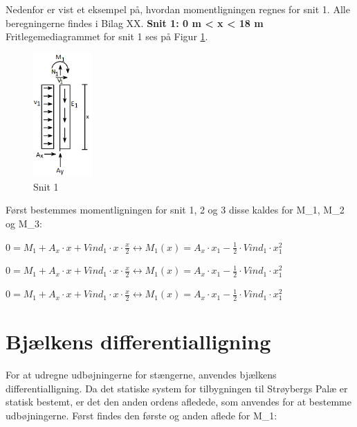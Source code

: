 Nedenfor er vist et eksempel på, hvordan momentligningen regnes for snit 1. Alle beregningerne findes i Bilag XX.
\newline
\newline
\textbf{Snit 1: 0 m < x < 18 m}
\newline
Fritlegemediagrammet for snit 1 ses på Figur \ref{fig:snitetan}.
\begin{figure}[H]
	\centering
	\includegraphics[width=0.2\textwidth]{billeder/asnitet.png}
	\caption{Snit 1}
	\label{fig:snitetan}
\end{figure}


Først bestemmes momentligningen for snit 1, 2 og 3 disse kaldes for M_1, M_2 og M_3:
\begin{center}
	$0 = M_1 + A_x \cdot x + Vind_1\cdot x\cdot \frac{x}{2} \leftrightarrow M_1(x) = A_x\cdot x_1 -\frac{1}{2}\cdot Vind_1 \cdot x_1^2$
\end{center}

\begin{center}
	$0 = M_1 + A_x \cdot x + Vind_1\cdot x\cdot \frac{x}{2} \leftrightarrow M_1(x) = A_x\cdot x_1 -\frac{1}{2}\cdot Vind_1 \cdot x_1^2$
\end{center}

\begin{center}
	$0 = M_1 + A_x \cdot x + Vind_1\cdot x\cdot \frac{x}{2} \leftrightarrow M_1(x) = A_x\cdot x_1 -\frac{1}{2}\cdot Vind_1 \cdot x_1^2$
\end{center}

\section{Bjælkens differentialligning}
For at udregne udbøjningerne for stængerne, anvendes bjælkens differentialligning. Da det statiske system for tilbygningen til Strøybergs Palæ er statisk bestemt, er det den anden ordens afledede, som anvendes for at bestemme udbøjningerne.
\newline
Først findes den første og anden aflede for M_1: %
 
